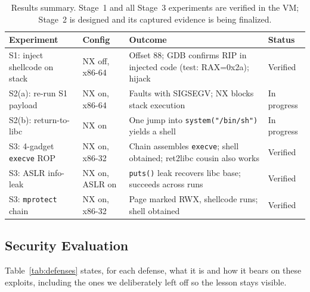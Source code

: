 \documentclass[10pt,twocolumn,letterpaper]{article}
\newcommand{\code}[1]{\texttt{\small #1}}
\begin{document}
\begin{table}[t]
  \centering
  \caption{Results summary. Stage~1 and all Stage~3 experiments are verified in the VM; Stage~2 is designed and its captured evidence is being finalized.}
  \label{tab:results}
  \small
  \begin{tabularx}{\textwidth}{@{}l l X l@{}}
    \toprule
    \textbf{Experiment} & \textbf{Config} & \textbf{Outcome} & \textbf{Status}\\
    \midrule
    S1: inject shellcode on stack & NX off, x86-64 & Offset 88; GDB confirms RIP in injected code (test: RAX=0x2a); hijack & Verified\\
    S2(a): re-run S1 payload & NX on, x86-64 & Faults with SIGSEGV; NX blocks stack execution & In progress\\
    S2(b): return-to-libc & NX on & One jump into \code{system("/bin/sh")} yields a shell & In progress\\
    S3: 4-gadget \code{execve} ROP & NX on, x86-32 & Chain assembles \code{execve}; shell obtained; ret2libc cousin also works & Verified\\
    S3: ASLR info-leak & NX on, ASLR on & \code{puts()} leak recovers libc base; succeeds across runs & Verified\\
    S3: \code{mprotect} chain & NX on, x86-32 & Page marked RWX, shellcode runs; shell obtained & Verified\\
    \bottomrule
  \end{tabularx}
\end{table}

\subsection{Security Evaluation}
Table~\ref{tab:defenses} states, for each defense, what it is and how it bears
on these exploits, including the ones we deliberately left off so the lesson
stays visible.
\end{document}
